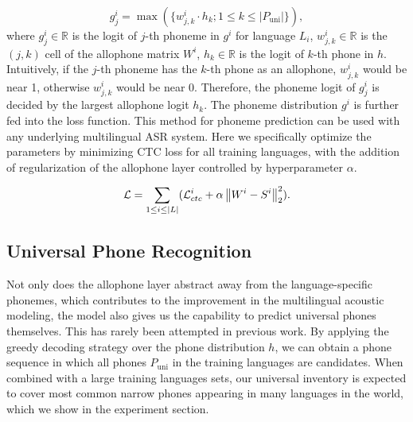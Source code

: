 \documentclass{article}
\newcommand{\norm}[1]{\left\lVert#1\right\rVert}
\begin{document}
\begin{equation}
g^i_{j}=\max(\{ w^i_{j,k} \cdot h_{k} ; 1 \leq k \leq |P_{\text{uni}}| \}),
\end{equation}
where $g^i_{j} \in \mathbb{R}$ is the logit of $j$-th phoneme in $g^i$ for language $L_i$, $w^i_{j,k} \in \mathbb{R}$ is the $(j,k)$ cell of the allophone matrix $W^i$, $h_{k} \in \mathbb{R}$ is the logit of $k$-th phone in $h$. Intuitively, if the $j$-th phoneme has the $k$-th phone as an allophone, $w^i_{j,k}$ would be near 1, otherwise $w^i_{j,k}$ would be near 0. Therefore, the phoneme logit of $g^i_j$ is decided by the largest allophone logit $h_k$. The phoneme distribution $g^i$ is further fed into the loss function. This method for phoneme prediction can be used with any underlying multilingual ASR system. Here we specifically optimize the parameters by minimizing CTC loss \cite{graves2006connectionist} for all training languages, with the addition of regularization of the allophone layer controlled by hyperparameter $\alpha$. %


\begin{equation}
\mathcal{L}=\sum_{1 \leq i \leq |L|} (\mathcal{L}^i_{ctc} + \alpha \norm{ W^i-S^i }_2^2 ).
\vspace{-2mm}
\end{equation}


\subsection{Universal Phone Recognition}

Not only does the allophone layer abstract away from the language-specific phonemes, which contributes to the improvement in the multilingual acoustic modeling, the model also gives us the capability to predict universal phones themselves.
This has rarely been attempted in previous work.
By applying the greedy decoding strategy over the phone distribution $h$, we can obtain a phone sequence in which all phones $P_{\text{uni}}$ in the training languages are candidates. When combined with a large training languages sets, our universal inventory is expected to cover most common narrow phones appearing in many languages in the world, which we show in the experiment section. 
\end{document}
